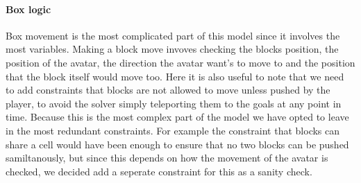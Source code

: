 \documentclass[british]{article}
\begin{document}
\paragraph{Box logic} Box movement is the most complicated part of this model since it involves the most variables. Making a block move invoves checking the blocks position, the position of the avatar, the direction the avatar want's to move to and the position that the block itself would move too. Here it is also useful to note that we need to add constraints that blocks are not allowed to move unless pushed by the player, to avoid the solver simply teleporting them to the goals at any point in time. Because this is the most complex part of the model we have opted to leave in the most redundant constraints. For example the constraint that blocks can share a cell would have been enough to ensure that no two blocks can be pushed samiltanously, but since this depends on how the movement of the avatar is checked, we decided add a seperate constraint for this as a sanity check. 
\end{document}
